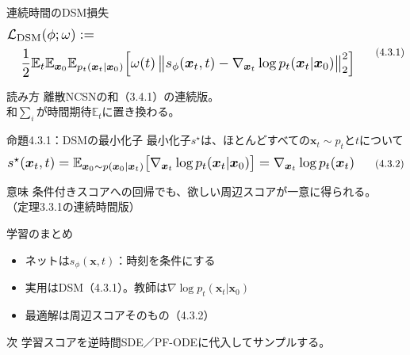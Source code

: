 \asmain
\begin{frame}{連続時間のDSM損失}
    \[
        \resizebox{0.98\textwidth}{!}{$
        \begin{aligned}
        &\mathcal{L}_{\mathrm{DSM}}(\phi;\omega)
        :=\\
        &\quad
        \dfrac12
        \mathbb{E}_{t}
        \mathbb{E}_{\bm{x}_0}
        \mathbb{E}_{p_t(\bm{x}_t|\bm{x}_0)}
        \Bigl[
        \omega(t)\,
        \bigl\|
        s_\phi(\bm{x}_t,t)
        -
        \nabla_{\bm{x}_t}\log p_t(\bm{x}_t|\bm{x}_0)
        \bigr\|_{2}^{2}
        \Bigr]
        \end{aligned}
        $}
        \tag{4.3.1}
    \]
    \begin{block}{読み方}
        離散NCSNの和（3.4.1）の連続版。\\
        和$\sum_i$が時間期待$\mathbb{E}_t$に置き換わる。
    \end{block}
\end{frame}
\asmain
\begin{frame}{命題4.3.1：DSMの最小化子}
    最小化子$s^{\star}$は、ほとんどすべての$\bm{x}_t\sim p_t$と$t$について
    \[
        \resizebox{0.98\textwidth}{!}{$
        s^{\star}(\bm{x}_t,t)
        =
        \mathbb{E}_{\bm{x}_0\sim p(\bm{x}_0|\bm{x}_t)}
        \bigl[
        \nabla_{\bm{x}_t}\log p_t(\bm{x}_t|\bm{x}_0)
        \bigr]
        =
        \nabla_{\bm{x}_t}\log p_t(\bm{x}_t)
        $}
        \tag{4.3.2}
    \]
    \begin{block}{意味}
        条件付きスコアへの回帰でも、欲しい周辺スコアが一意に得られる。\\
        （定理3.3.1の連続時間版）
    \end{block}
\end{frame}
\asmain
\begin{frame}{学習のまとめ}
    \begin{itemize}
        \item ネットは$s_\phi(\bm{x},t)$：時刻を条件にする
        \item 実用はDSM（4.3.1）。教師は$\nabla\log p_t(\bm{x}_t|\bm{x}_0)$
        \item 最適解は周辺スコアそのもの（4.3.2）
    \end{itemize}
    \begin{block}{次}
        学習スコアを逆時間SDE／PF-ODEに代入してサンプルする。
    \end{block}
\end{frame}
